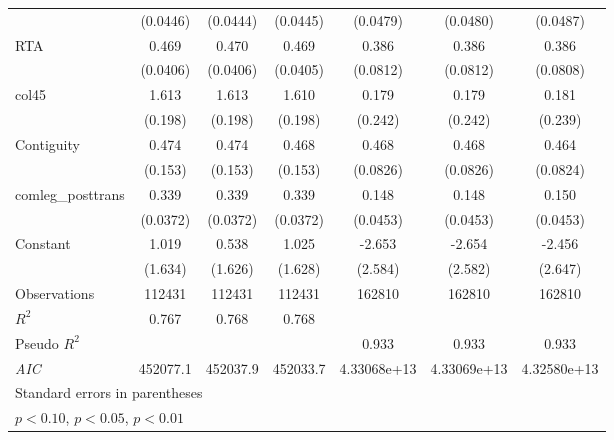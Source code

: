 {\begin{tabular}{l*{6}{c}}
                    &    (0.0446)         &    (0.0444)         &    (0.0445)         &    (0.0479)         &    (0.0480)         &    (0.0487)         \\
[1em]
RTA                 &       0.469\sym{***}&       0.470\sym{***}&       0.469\sym{***}&       0.386\sym{***}&       0.386\sym{***}&       0.386\sym{***}\\
                    &    (0.0406)         &    (0.0406)         &    (0.0405)         &    (0.0812)         &    (0.0812)         &    (0.0808)         \\
[1em]
col45               &       1.613\sym{***}&       1.613\sym{***}&       1.610\sym{***}&       0.179         &       0.179         &       0.181         \\
                    &     (0.198)         &     (0.198)         &     (0.198)         &     (0.242)         &     (0.242)         &     (0.239)         \\
[1em]
Contiguity          &       0.474\sym{***}&       0.474\sym{***}&       0.468\sym{***}&       0.468\sym{***}&       0.468\sym{***}&       0.464\sym{***}\\
                    &     (0.153)         &     (0.153)         &     (0.153)         &    (0.0826)         &    (0.0826)         &    (0.0824)         \\
[1em]
comleg\_posttrans    &       0.339\sym{***}&       0.339\sym{***}&       0.339\sym{***}&       0.148\sym{***}&       0.148\sym{***}&       0.150\sym{***}\\
                    &    (0.0372)         &    (0.0372)         &    (0.0372)         &    (0.0453)         &    (0.0453)         &    (0.0453)         \\
[1em]
Constant            &       1.019         &       0.538         &       1.025         &      -2.653         &      -2.654         &      -2.456         \\
                    &     (1.634)         &     (1.626)         &     (1.628)         &     (2.584)         &     (2.582)         &     (2.647)         \\
\hline
Observations        &      112431         &      112431         &      112431         &      162810         &      162810         &      162810         \\
\(R^{2}\)           &       0.767         &       0.768         &       0.768         &                     &                     &                     \\
Pseudo \(R^{2}\)    &                     &                     &                     &       0.933         &       0.933         &       0.933         \\
\textit{AIC}        &    452077.1         &    452037.9         &    452033.7         & 4.33068e+13         & 4.33069e+13         & 4.32580e+13         \\
\hline\hline
\multicolumn{7}{l}{\footnotesize Standard errors in parentheses}\\
\multicolumn{7}{l}{\footnotesize \sym{*} \(p<0.10\), \sym{**} \(p<0.05\), \sym{***} \(p<0.01\)}\\
\end{tabular}
}
